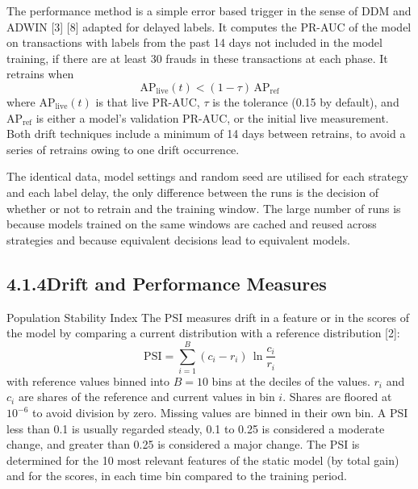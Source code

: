 \documentclass[11pt,letterpaper]{report}
\begin{document}
The performance method is a simple error based trigger in the sense of DDM and ADWIN [3] [8] adapted for delayed labels. It computes the PR-AUC of the model on transactions with labels from the past 14 days not included in the model training, if there are at least 30 frauds in these transactions at each phase. It retrains when
\begin{equation*}
  \mathrm{AP}_{\mathrm{live}}(t) < (1 - \tau)\, \mathrm{AP}_{\mathrm{ref}} \tag{4.2}
\end{equation*}
where $\mathrm{AP}_{\mathrm{live}}(t)$ is that live PR-AUC, $\tau$ is the tolerance (0.15 by default), and $\mathrm{AP}_{\mathrm{ref}}$ is either a model's validation PR-AUC, or the initial live measurement. Both drift techniques include a minimum of 14 days between retrains, to avoid a series of retrains owing to one drift occurrence.

The identical data, model settings and random seed are utilised for each strategy and each label delay, the only difference between the runs is the decision of whether or not to retrain and the training window. The large number of runs is because models trained on the same windows are cached and reused across strategies and because equivalent decisions lead to equivalent models.

\subsection*{4.1.4\quad Drift and Performance Measures}

Population Stability Index The PSI measures drift in a feature or in the scores of the model by comparing a current distribution with a reference distribution [2]:
\begin{equation*}
  \mathrm{PSI} = \sum_{i=1}^{B} (c_i - r_i)\,\ln\frac{c_i}{r_i} \tag{4.3}
\end{equation*}
with reference values binned into $B = 10$ bins at the deciles of the values. $r_i$ and $c_i$ are shares of the reference and current values in bin $i$. Shares are floored at $10^{-6}$ to avoid division by zero. Missing values are binned in their own bin. A PSI less than 0.1 is usually regarded steady, 0.1 to 0.25 is considered a moderate change, and greater than 0.25 is considered a major change. The PSI is determined for the 10 most relevant features of the static model (by total gain) and for the scores, in each time bin compared to the training period.
\end{document}
